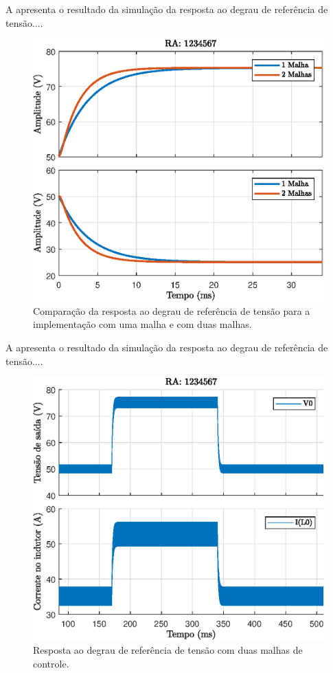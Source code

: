 



A  apresenta o resultado da simulação da resposta ao degrau de referência de tensão....

\begin{figure}[!ht]
	\centering
	\includegraphics[width=0.9\linewidth]{Figs/BuckStepResponse2malhas}
	\caption{Comparação da resposta ao degrau de referência de tensão para a implementação com uma malha e com duas malhas.}
	\label{fig:BuckStepResponse2malhas}
\end{figure}


A  apresenta o resultado da simulação da resposta ao degrau de referência de tensão....

\begin{figure}[!ht]
	\centering
	\includegraphics[width=0.9\linewidth]{Figs/Buck2malhas}
	\caption{Resposta ao degrau de referência de tensão com duas malhas de controle.}
	\label{fig:Buck2malhas}
\end{figure}
